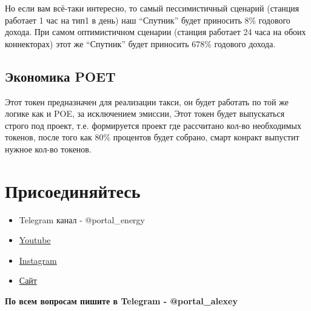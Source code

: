 \documentclass[a4paper,12pt]{report}
\begin{document}
Но если вам всё-таки интересно, то самый пессимистичный сценарий (станция работает 1 час на тип1 в день) наш “Спутник” будет приносить 8\% годового дохода. При самом оптимистичном сценарии (станция работает 24 часа на обоих коннекторах) этот же “Спутник” будет приносить 678\% годового дохода.


\section{Экономика POET}

Этот токен предназначен для реализации такси, он будет работать по той же логике как и POE, за исключением эмиссии, Этот токен будет выпускаться строго под проект, т.е. формируется проект где рассчитано кол-во необходимых токенов, после того как 80\% процентов будет собрано, смарт конракт выпустит нужное кол-во токенов. 


\chapter{Присоединяйтесь}

\begin{itemize}
	\item Telegram канал - @portal\_energy
	\item \href{https://www.youtube.com/channel/UCtPxyCkz73i78F9HChlO61w}{Youtube}
	\item \href{https://www.instagram.com/petr_roadrunner/}{Instagram}
	\item \href{https://portalenergy.tech}{Сайт}
\end{itemize}

\textbf{По всем вопросам пишите в Telegram - @portal\_alexey}
\end{document}
